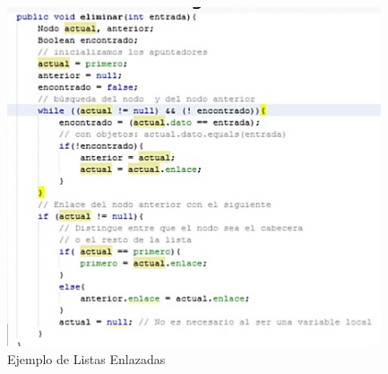 \documentclass{article}
\begin{document}
\begin{figure}[ht]
    \centering     
    \includegraphics[height=10cm]{images/figura7.jpg}
    \caption{Ejemplo de Listas Enlazadas}
    \label{fig:BiasVoltager}
    
\end{figure}
\end{document}

